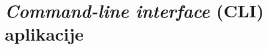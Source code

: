 \documentclass[times, utf8, seminar]{fit}
\begin{document}

%


%
%
%
%
%
%
%
%

%
%

\section{\emph{Command-line interface} (CLI) aplikacije}
\end{document}
